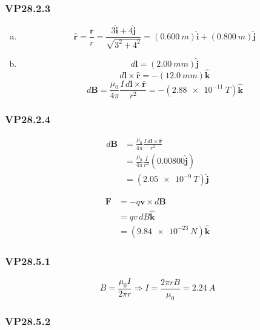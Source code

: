 \documentclass{article}
\begin{document}
\subsubsection{VP28.2.3}

\begin{enumerate}[(a)]
  \item \[\hat{\mathbf{r}} = \frac{\mathbf{r}}{r} = \frac{3 \hat{\mathbf{i}} + 4 \hat{\mathbf{j}}}{\sqrt{3^2 + 4^2}} = (\qty{0.600}{m}) \hat{\mathbf{i}} + (\qty{0.800}{m}) \hat{\mathbf{j}}\]

  \item

        \[d\mathbf{l} = (\qty{2.00}{mm}) \hat{\mathbf{j}}\]
        \[d\mathbf{l} \times \hat{\mathbf{r}} = -(\qty{12.0}{mm}) \hat{\mathbf{k}}\]
        \[d\mathbf{B} = \frac{\mu_0}{4 \pi} \frac{I \,d\mathbf{l} \times \hat{\mathbf{r}}}{r^2} = -(\qty{2.88e-11}{T}) \hat{\mathbf{k}}\]
\end{enumerate}

\subsubsection{VP28.2.4}

\begin{align*}
  d\mathbf{B} & = \frac{\mu_0}{4 \pi} \frac{I \,d\mathbf{l} \times \hat{\mathbf{r}}}{r^2} \\
              & = \frac{\mu_0}{4 \pi} \frac{I}{r^2} (0.00800 \hat{\mathbf{j}})            \\
              & = (\qty{2.05e-9}{T}) \hat{\mathbf{j}}
\end{align*}

\begin{align*}
  \mathbf{F} & = -q \mathbf{v} \times d \mathbf{B}    \\
             & = q v \,dB \hat{\mathbf{k}}            \\
             & = (\qty{9.84e-23}{N}) \hat{\mathbf{k}}
\end{align*}

\subsubsection{VP28.5.1}

\[B = \frac{\mu_0 I}{2 \pi r} \Rightarrow I = \frac{2 \pi r B}{\mu_0} = \qty{2.24}{A}\]

\subsubsection{VP28.5.2}
\end{document}
